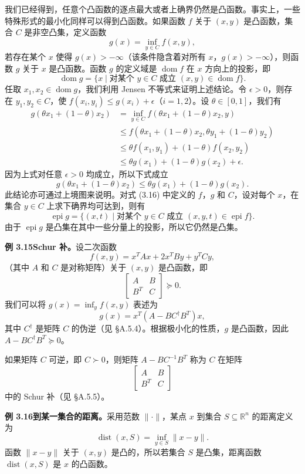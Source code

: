 \documentclass[UTF8,12pt,a4paper,fontset=fandol]{ctexart}
\DeclareMathOperator{\dom}{dom}
\DeclareMathOperator{\dist}{dist}
\DeclareMathOperator{\epi}{epi}
\begin{document}
我们已经得到，任意个凸函数的逐点最大或者上确界仍然是凸函数。事实上，一些特殊形式的最小化同样可以得到凸函数。如果函数 $f$ 关于 $(x,y)$ 是凸函数，集合 $C$ 是非空凸集，定义函数
\begin{equation}
g(x)=\inf_{y\in C} f(x,y),
\tag{3.16}
\end{equation}
若存在某个 $x$ 使得 $g(x)>-\infty$（该条件隐含着对所有 $x$，$g(x)>-\infty$），则函数 $g$ 关于 $x$ 是凸函数。函数 $g$ 的定义域是 $\dom f$ 在 $x$ 方向上的投影，即
\[
\dom g=\{x\mid \text{对某个 }y\in C\text{ 成立 }(x,y)\in\dom f\}.
\]
任取 $x_1,x_2\in\dom g$，我们利用 Jensen 不等式来证明上述结论。令 $\epsilon>0$，则存在 $y_1,y_2\in C$，使 $f(x_i,y_i)\leq g(x_i)+\epsilon$（$i=1,2$）。设 $\theta\in[0,1]$，我们有
\[
\begin{aligned}
g(\theta x_1+(1-\theta)x_2)
&=\inf_{y\in C} f(\theta x_1+(1-\theta)x_2,y)\\
&\leq f(\theta x_1+(1-\theta)x_2,\theta y_1+(1-\theta)y_2)\\
&\leq \theta f(x_1,y_1)+(1-\theta)f(x_2,y_2)\\
&\leq \theta g(x_1)+(1-\theta)g(x_2)+\epsilon.
\end{aligned}
\]
因为上式对任意 $\epsilon>0$ 均成立，所以下式成立
\[
g(\theta x_1+(1-\theta)x_2)\leq \theta g(x_1)+(1-\theta)g(x_2).
\]
此结论亦可通过上境图来说明。对式 (3.16) 中定义的 $f$，$g$ 和 $C$，设对每个 $x$，在集合 $y\in C$ 上求下确界均可达到，则有
\[
\epi g=\{(x,t)\mid \text{对某个 }y\in C\text{ 成立 }(x,y,t)\in\epi f\}.
\]
由于 $\epi g$ 是凸集在其中一些分量上的投影，所以它仍然是凸集。

\noindent\textbf{例 3.15\quad Schur 补。}\quad 设二次函数
\[
f(x,y)=x^TAx+2x^TBy+y^TCy,
\]
（其中 $A$ 和 $C$ 是对称矩阵）关于 $(x,y)$ 是凸函数，即
\[
\begin{bmatrix}
A & B\\
B^T & C
\end{bmatrix}\succeq0.
\]
我们可以将 $g(x)=\inf_y f(x,y)$ 表述为
\[
g(x)=x^T(A-BC^\dagger B^T)x,
\]
其中 $C^\dagger$ 是矩阵 $C$ 的伪逆（见 \S A.5.4）。根据极小化的性质，$g$ 是凸函数，因此 $A-BC^\dagger B^T\succeq0$。

如果矩阵 $C$ 可逆，即 $C\succ0$，则矩阵 $A-BC^{-1}B^T$ 称为 $C$ 在矩阵
\[
\begin{bmatrix}
A & B\\
B^T & C
\end{bmatrix}
\]
中的 Schur 补（见 \S A.5.5）。

\noindent\textbf{例 3.16\quad 到某一集合的距离。}\quad 采用范数 $\|\cdot\|$，某点 $x$ 到集合 $S\subseteq\mathbb{R}^n$ 的距离定义为
\[
\dist(x,S)=\inf_{y\in S}\|x-y\|.
\]
函数 $\|x-y\|$ 关于 $(x,y)$ 是凸的，所以若集合 $S$ 是凸集，距离函数 $\dist(x,S)$ 是 $x$ 的凸函数。
\end{document}
